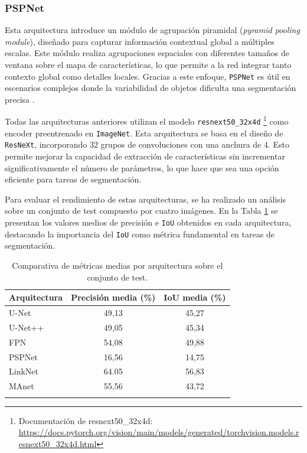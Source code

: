 \subsubsection{PSPNet} 
Esta arquitectura introduce un módulo de agrupación piramidal (\textit{pyramid pooling module}), diseñado para capturar información contextual global a múltiples escalas. Este módulo realiza agrupaciones espaciales con diferentes tamaños de ventana sobre el mapa de características, lo que permite a la red integrar tanto contexto global como detalles locales. Gracias a este enfoque, \texttt{PSPNet} es útil en escenarios complejos donde la variabilidad de objetos dificulta una segmentación precisa \cite{pspnet2017}.

Todas las arquitecturas anteriores utilizan el modelo \texttt{resnext50\_32x4d} \footnote{Documentación de resnext50\_32x4d: \url{https://docs.pytorch.org/vision/main/models/generated/torchvision.models.resnext50_32x4d.html}} como encoder preentrenado en \texttt{ImageNet}. Esta arquitectura se basa en el diseño de \texttt{ResNeXt}, incorporando 32 grupos de convoluciones con una anchura de 4. Esto permite mejorar la capacidad de extracción de características sin incrementar significativamente el número de parámetros, lo que hace que sea una opción eficiente para tareas de segmentación.

Para evaluar el rendimiento de estas arquitecturas, se ha realizado un análisis sobre un conjunto de test compuesto por cuatro imágenes. En la Tabla \ref{tab:resultados_sindataaumentation} se presentan los valores medios de precisión e \texttt{IoU} obtenidos en cada arquitectura, destacando la importancia del \texttt{IoU} como métrica fundamental en tareas de segmentación.

\begin{table}[h]
    \centering
    \begin{tabular}{lcc}
    \textbf{Arquitectura} & \textbf{Precisión media (\%)} & \textbf{IoU media (\%)} \\
    \hline
    U-Net             & 49,13 & 45,27\\
    U-Net++           & 49,05 & 45,34\\
    FPN               & 54,08 & 49,88\\
    PSPNet            & 16,56 & 14,75\\
    LinkNet           & 64.05 & 56,83\\
    MAnet             & 55,56 & 43,72\\
    \hfill
    \end{tabular}
    \caption{Comparativa de métricas medias por arquitectura sobre el conjunto de test.} \label{tab:resultados_sindataaumentation}
\end{table}

